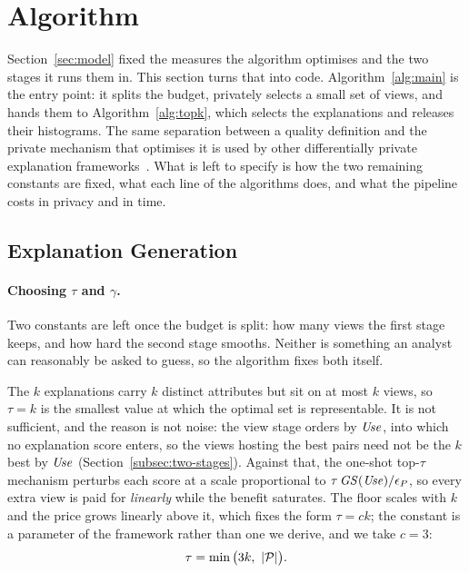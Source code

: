 
\section{Algorithm}\label{sec:solution}

Section~\ref{sec:model} fixed the measures the algorithm optimises and the two stages it runs them in.
This section turns that into code.
Algorithm~\ref{alg:main} is the entry point: it splits the budget, privately selects a small set of views, and hands them to Algorithm~\ref{alg:topk}, which selects the explanations and releases their histograms.
The same separation between a quality definition and the private mechanism that optimises it is used by other differentially private explanation frameworks~\cite{TaoGMR22}.
What is left to specify is how the two remaining constants are fixed, what each line of the algorithms does, and what the pipeline costs in privacy and in time.

\subsection{Explanation Generation}
\label{subsec:explanation-generation}

\paragraph{Choosing $\tau$ and $\gamma$.}
Two constants are left once the budget is split: how many views the first stage keeps, and how hard the second stage smooths.
Neither is something an analyst can reasonably be asked to guess, so the algorithm fixes both itself.

The $k$ explanations carry $k$ distinct attributes but sit on at most $k$ views, so $\tau=k$ is the smallest value at which the optimal set is representable.
It is not sufficient, and the reason is not noise: the view stage orders by $\mathit{Use}$, into which no explanation score enters, so the views hosting the best pairs need not be the $k$ best by $\mathit{Use}$ (Section~\ref{subsec:two-stages}).
Against that, the one-shot top-$\tau$ mechanism perturbs each score at a scale proportional to $\tau\,\mathit{GS}(\mathit{Use})/\epsilon_P$, so every extra view is paid for \emph{linearly} while the benefit saturates.
The floor scales with $k$ and the price grows linearly above it, which fixes the form $\tau=ck$; the constant is a parameter of the framework rather than one we derive, and we take $c=3$:
\begin{equation}
\tau=\min\big(3k,\ |\mathcal{P}|\big).
\label{eq:tau-rule}
\end{equation}

